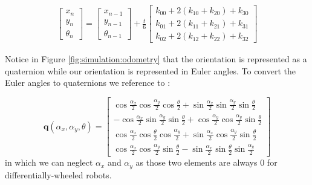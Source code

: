 \begin{equation}
\begin{aligned}
    \begin{bmatrix}
        x_n \\
        y_n \\
        \theta_n
    \end{bmatrix} = \begin{bmatrix}
        x_{n-1} \\
        y_{n-1} \\
        \theta_{n-1}
    \end{bmatrix} + \frac{t}{6}
    \begin{bmatrix}
        k_{00} + 2 (k_{10} + k_{20}) + k_{30} \\
        k_{01} + 2 (k_{11} + k_{21}) + k_{31} \\
        k_{02} + 2 (k_{12} + k_{22}) + k_{32}
    \end{bmatrix} 
\end{aligned}
\end{equation}

Notice in Figure \ref{fig:simulation:odometry} that the orientation is represented as a quaternion while our orientation is represented in Euler angles. To convert the Euler angles to quaternions we reference to \cite[p. 12]{diebel_representing_2006}: 

\begin{equation}
    \bm{q}(\alpha_x, \alpha_y, \theta) = \begin{bmatrix}
        \cos{\frac{\alpha_x}{2}} \cos{\frac{\alpha_y}{2}} \cos{\frac{\theta}{2}} + \sin{\frac{\alpha_x}{2}} \sin{\frac{\alpha_y}{2}} \sin{\frac{\theta}{2}} \\
        -\cos{\frac{\alpha_x}{2}} \sin{\frac{\alpha_y}{2}} \sin{\frac{\theta}{2}} + \cos{\frac{\alpha_y}{2}} \cos{\frac{\alpha_y}{2}} \sin{\frac{\theta}{2}} \\
        \cos{\frac{\alpha_x}{2}} \cos{\frac{\theta}{2}} \cos{\frac{\alpha_y}{2}} + \sin{\frac{\alpha_x}{2}} \cos{\frac{\alpha_y}{2}} \sin{\frac{\theta}{2}} \\
        \cos{\frac{\alpha_x}{2}} \cos{\frac{\alpha_y}{2}} \sin{\frac{\theta}{2}} - \sin{\frac{\alpha_x}{2}} \sin{\frac{\theta}{2}} \sin{\frac{\alpha_y}{2}}
    \end{bmatrix}
\end{equation}
in which we can neglect $ \alpha_x $ and $ \alpha_y $ as those two elements are always 0 for differentially-wheeled robots.

